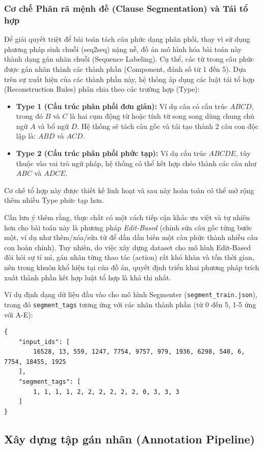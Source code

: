 \subsubsection{Cơ chế Phân rã mệnh đề (Clause Segmentation) và Tái tổ hợp}
Để giải quyết triệt để bài toán tách câu phức dạng phân phối, thay vì sử dụng phương pháp sinh chuỗi (seq2seq) nặng nề, đồ án mô hình hóa bài toán này thành dạng gán nhãn chuỗi (Sequence Labeling). Cụ thể, các từ trong câu phức được gán nhãn thành các thành phần (Component, đánh số từ 1 đến 5). Dựa trên sự xuất hiện của các thành phần này, hệ thống áp dụng các luật tái tổ hợp (Reconstruction Rules) phân chia theo các trường hợp (Type):
\begin{itemize}
    \item \textbf{Type 1 (Cấu trúc phân phối đơn giản):} Ví dụ câu có cấu trúc $A B C D$, trong đó $B$ và $C$ là hai cụm động từ hoặc tính từ song song dùng chung chủ ngữ $A$ và bổ ngữ $D$. Hệ thống sẽ tách câu gốc và tái tạo thành 2 câu con độc lập là: $A B D$ và $A C D$.
    \item \textbf{Type 2 (Cấu trúc phân phối phức tạp):} Ví dụ cấu trúc $A B C D E$, tùy thuộc vào vai trò ngữ pháp, hệ thống có thể kết hợp chéo thành các câu như $A B C$ và $A D C E$.
\end{itemize}
Cơ chế tổ hợp này được thiết kế linh hoạt và sau này hoàn toàn có thể mở rộng thêm nhiều Type phức tạp hơn. 

Cần lưu ý thêm rằng, thực chất có một cách tiếp cận khác ưu việt và tự nhiên hơn cho bài toán này là phương pháp \textit{Edit-Based} (chỉnh sửa câu gốc từng bước một, ví dụ như thêm/xóa/sửa từ để dần dần biến một câu phức thành nhiều câu con hoàn chỉnh). Tuy nhiên, do việc xây dựng dataset cho mô hình Edit-Based đòi hỏi sự tỉ mỉ, gán nhãn từng thao tác (action) rất khó khăn và tốn thời gian, nên trong khuôn khổ hiện tại của đồ án, quyết định triển khai phương pháp trích xuất thành phần kết hợp luật tổ hợp là khả thi nhất.

Ví dụ định dạng dữ liệu đầu vào cho mô hình Segmenter (\texttt{segment\_train.json}), trong đó \texttt{segment\_tags} tương ứng với các nhãn thành phần (từ 0 đến 5, 1-5 ứng với A-E):
\begin{verbatim}
{
    "input_ids": [
        16528, 13, 559, 1247, 7754, 9757, 979, 1936, 6298, 540, 6, 7754, 18455, 1925
    ],
    "segment_tags": [
        1, 1, 1, 1, 2, 2, 2, 2, 2, 2, 0, 3, 3, 3
    ]
}
\end{verbatim}

\subsection{Xây dựng tập gán nhãn (Annotation Pipeline)}

